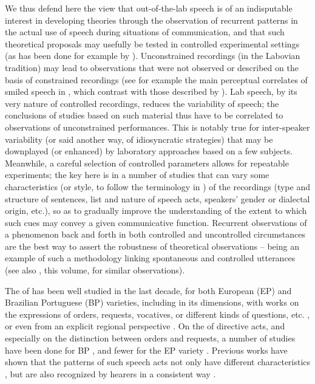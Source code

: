 \documentclass[output=paper]{LSP/langsci}
\begin{document}
We thus defend here the view that out-of-the-lab speech is of an indisputable interest in developing theories through the observation of recurrent patterns in the actual use of speech during situations of communication, and that such theoretical proposals may usefully be tested in controlled experimental settings (as has been done for example by \citealt{GussenhovenChen2000,Boula2002,house2005phrase,dimperio2010alignment,Vanrell2013certainty,Borras-Comes2015}). 
Unconstrained recordings (in the Labovian tradition) may lead to observations that were not observed or described on the basis of constrained recordings (see for example the main perceptual correlates of smiled speech in \citealt{Emond2013}, which contrast with those described by \citealt{Tartter1980}). 
Lab speech, by its very nature of controlled recordings, reduces the variability of speech; the conclusions of studies based on such material thus have to be correlated to observations of unconstrained performances. 
This is notably true for inter-speaker variability (or said another way, of idiosyncratic strategies) that may be downplayed (or enhanced) by laboratory approaches based on a few subjects. 
Meanwhile, a careful selection of controlled parameters allows for repeatable experiments; the key here is in a number of studies that can vary some characteristics (or style, to follow the terminology in \citealt{Wagner.2015}) of the recordings (type and structure of sentences, list and nature of speech acts, speakers' gender or dialectal origin, etc.), so as to gradually improve the understanding of the extent to which such cues may convey a given communicative function. 
Recurrent observations of a phenomenon back and forth in both controlled and uncontrolled circumstances are the best way to assert the robustness of theoretical observations -- \citet{house2005phrase} being an example of such a methodology linking spontaneous and controlled utterances (see also \citeauthor{Peskova.2018}, this volume, for similar observations).

The  of  has been well studied in the last decade, for both European  (EP) and Brazilian Portuguese (BP) varieties, including in its  dimensions, with works on the expressions of orders, requests, vocatives, or different kinds of questions, etc. \citep{moraes2008pitch,Frota2014,frotaPrieto2015,FrotaAndMoraes2016}, or even from an explicit regional perspective \citep{frota2015portuguese}. 
On the  of directive acts, and especially on the distinction between orders and requests, a number of studies have been done for BP \citep{Bodolay2009,Queiroz2011,Rocha2013,Rocha2016}, and fewer for the EP variety \citep{fale2007imperatives}.
Previous works have shown that the  patterns of such speech acts not only have different  characteristics \citep{fale2007imperatives}, but are also recognized by hearers in a consistent way \citep{veliz2004intonational,moraes2008pitch,moraes2014}.\largerpage[-1]
\end{document}
